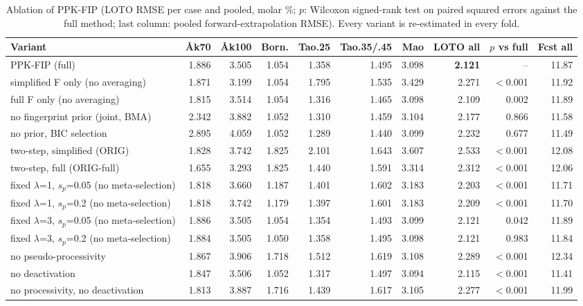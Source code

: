 \begin{table}[t]
\centering
\caption{Ablation of PPK-FIP (LOTO RMSE per case and pooled, molar \%; $p$: Wilcoxon signed-rank test on paired squared errors against the full method; last column: pooled forward-extrapolation RMSE). Every variant is re-estimated in every fold.}\label{tab:ablation}
\scriptsize
\begin{adjustbox}{max width=\linewidth}
\begin{tabular}{lrrrrrrrrr}
\toprule
Variant & Åk70 & Åk100 & Born. & Tao.25 & Tao.35/.45 & Mao & LOTO all & $p$ vs full & Fcst all \\
\midrule
PPK-FIP (full) & 1.886 & 3.505 & 1.054 & 1.358 & 1.495 & 3.098 & \textbf{2.121} & -- & 11.87 \\
simplified F only (no averaging) & 1.871 & 3.199 & 1.054 & 1.795 & 1.535 & 3.429 & 2.271 & $<$0.001 & 11.92 \\
full F only (no averaging) & 1.815 & 3.514 & 1.054 & 1.316 & 1.465 & 3.098 & 2.109 & 0.002 & 11.89 \\
no fingerprint prior (joint, BMA) & 2.342 & 3.882 & 1.052 & 1.310 & 1.459 & 3.104 & 2.177 & 0.866 & 11.58 \\
no prior, BIC selection & 2.895 & 4.059 & 1.052 & 1.289 & 1.440 & 3.099 & 2.232 & 0.677 & 11.49 \\
two-step, simplified (ORIG) & 1.828 & 3.742 & 1.825 & 2.101 & 1.643 & 3.607 & 2.533 & $<$0.001 & 12.08 \\
two-step, full (ORIG-full) & 1.655 & 3.293 & 1.825 & 1.440 & 1.591 & 3.314 & 2.312 & $<$0.001 & 12.06 \\
fixed $\lambda$=1, $s_p$=0.05 (no meta-selection) & 1.818 & 3.660 & 1.187 & 1.401 & 1.602 & 3.183 & 2.203 & $<$0.001 & 11.71 \\
fixed $\lambda$=1, $s_p$=0.2 (no meta-selection) & 1.818 & 3.742 & 1.179 & 1.397 & 1.601 & 3.183 & 2.209 & $<$0.001 & 11.70 \\
fixed $\lambda$=3, $s_p$=0.05 (no meta-selection) & 1.886 & 3.505 & 1.054 & 1.354 & 1.493 & 3.099 & 2.121 & 0.042 & 11.89 \\
fixed $\lambda$=3, $s_p$=0.2 (no meta-selection) & 1.884 & 3.505 & 1.050 & 1.358 & 1.495 & 3.098 & 2.121 & 0.983 & 11.84 \\
no pseudo-processivity & 1.867 & 3.906 & 1.718 & 1.512 & 1.619 & 3.108 & 2.289 & $<$0.001 & 12.34 \\
no deactivation & 1.847 & 3.506 & 1.052 & 1.317 & 1.497 & 3.094 & 2.115 & $<$0.001 & 11.41 \\
no processivity, no deactivation & 1.813 & 3.887 & 1.716 & 1.439 & 1.617 & 3.105 & 2.277 & $<$0.001 & 11.99 \\
\bottomrule
\end{tabular}
\end{adjustbox}
\end{table}
